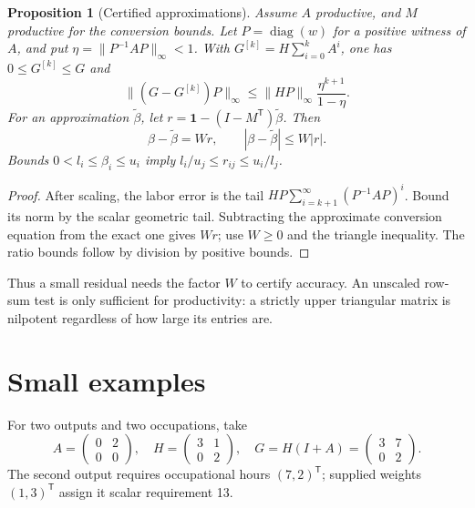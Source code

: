 \documentclass[11pt,a4paper]{article}
\newtheorem{proposition}[theorem]{Proposition}
\begin{document}
\begin{proposition}[Certified approximations]
Assume $A$ productive, and $M$ productive for the conversion bounds. Let $P=\operatorname{diag}(w)$ for a positive witness of $A$, and put $\eta=\|P^{-1}AP\|_\infty<1$. With $G^{[k]}=H\sum_{i=0}^{k}A^i$, one has $0\leq G^{[k]}\leq G$ and
\begin{equation}
\|(G-G^{[k]})P\|_\infty\leq\|HP\|_\infty\frac{\eta^{k+1}}{1-\eta}.
\end{equation}
For an approximation $\widetilde\beta$, let $r=\mathbf1-(I-M^{\mathsf T})\widetilde\beta$. Then
\begin{equation}
\beta-\widetilde\beta=Wr,\qquad |\beta-\widetilde\beta|\leq W|r|.
\end{equation}
Bounds $0<l_i\leq\beta_i\leq u_i$ imply $l_i/u_j\leq r_{ij}\leq u_i/l_j$.
\end{proposition}
\begin{proof}
After scaling, the labor error is the tail $HP\sum_{i=k+1}^{\infty}(P^{-1}AP)^i$. Bound its norm by the scalar geometric tail. Subtracting the approximate conversion equation from the exact one gives $Wr$; use $W\geq0$ and the triangle inequality. The ratio bounds follow by division by positive bounds.
\end{proof}

Thus a small residual needs the factor $W$ to certify accuracy. An unscaled row-sum test is only sufficient for productivity: a strictly upper triangular matrix is nilpotent regardless of how large its entries are.

\section{Small examples}
For two outputs and two occupations, take
\begin{equation}
A=\begin{pmatrix}0&2\\0&0\end{pmatrix},\quad
H=\begin{pmatrix}3&1\\0&2\end{pmatrix},\quad
G=H(I+A)=\begin{pmatrix}3&7\\0&2\end{pmatrix}.
\end{equation}
The second output requires occupational hours $(7,2)^{\mathsf T}$; supplied weights $(1,3)^{\mathsf T}$ assign it scalar requirement 13.
\end{document}
